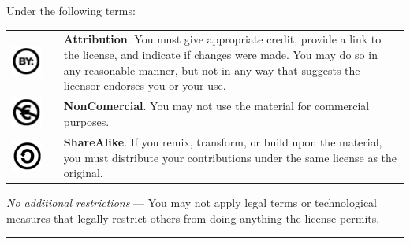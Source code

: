 Under the following terms:
\begin{center}
\begin{tabular}{ccp{10cm}}
\includegraphics[scale=0.15]{../img/cc-by} & \quad & \textbf{Attribution}. You must give appropriate credit, provide a
link to the license, and indicate if changes were made. You may do so in any reasonable manner, but not in any way that
suggests the licensor endorses you or your use.\\ 
\includegraphics[scale=0.15]{../img/cc-e} & \quad & \textbf{NonComercial}. You may not use the material for commercial
purposes.\\
\includegraphics[scale=0.15]{../img/cc-c} & \quad & \textbf{ShareAlike}. If you remix, transform, or build upon the
material, you must distribute your contributions under the same license as the original. 
\end{tabular}
\end{center}

\emph{No additional restrictions} — You may not apply legal terms or technological measures that legally restrict others
from doing anything the license permits.

\smallskip

\hrule depth 3pt

\normalfont
\newpage

